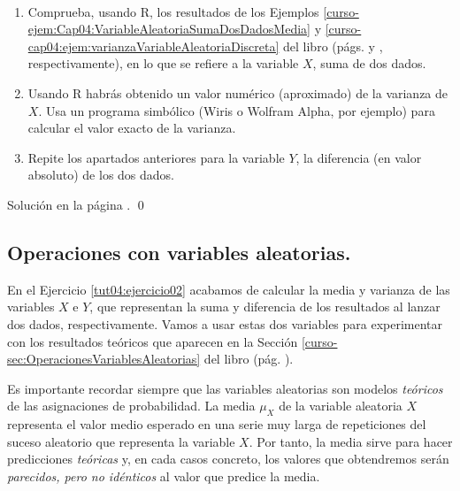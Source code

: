 \documentclass[10pt,a4paper]{article}\usepackage[]{graphicx}\usepackage[]{color}
\begin{document}
\begin{ejercicio}
\label{tut04:ejercicio02}
\quad\\
\begin{enumerate}
  \item Comprueba, usando R, los resultados de los Ejemplos \ref{curso-ejem:Cap04:VariableAleatoriaSumaDosDadosMedia} y \ref{curso-cap04:ejem:varianzaVariableAleatoriaDiscreta} del libro (págs. \pageref{curso-ejem:Cap04:VariableAleatoriaSumaDosDadosMedia} y \pageref{curso-cap04:ejem:varianzaVariableAleatoriaDiscreta}, respectivamente), en lo que se refiere a la variable $X$, suma de dos dados.

  \item Usando R habrás obtenido un valor numérico (aproximado) de la varianza de $X$. Usa un programa simbólico (Wiris o Wolfram Alpha, por ejemplo) para calcular el valor exacto de la varianza.

  \item  Repite los apartados anteriores para la variable $Y$, la diferencia (en valor absoluto) de los dos dados.


\end{enumerate}

Solución en la página \pageref{tut04:ejercicio02:sol}.
\qed
\end{ejercicio}

\subsection{Operaciones con variables aleatorias.}
\label{tut04:subsec:OperacionesVariablesAleatorias}

En el Ejercicio \ref{tut04:ejercicio02} acabamos de calcular la media y varianza de las variables $X$ e $Y$, que representan la suma y diferencia de los resultados al lanzar dos dados, respectivamente. Vamos a usar estas dos variables para experimentar con los resultados teóricos que aparecen en la Sección \ref{curso-sec:OperacionesVariablesAleatorias} del libro (pág. \pageref{curso-sec:OperacionesVariablesAleatorias}).

Es importante recordar siempre que las variables aleatorias son modelos {\em teóricos} de las asignaciones de probabilidad. La media $\mu_X$ de la variable aleatoria $X$ representa el valor medio esperado en una serie muy larga de repeticiones del suceso aleatorio que representa la variable $X$.  Por tanto, la media sirve para hacer predicciones {\em teóricas} y, en cada casos concreto, los valores que obtendremos serán {\em parecidos, pero no idénticos} al valor que predice la media.
\end{document}
